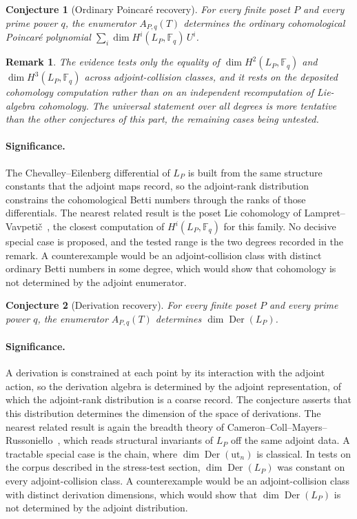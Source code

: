 \documentclass[11pt]{article}
\newtheorem{conjecture}{Conjecture}
\newtheorem{remark}{Remark}
\theoremstyle{definition}
\newcommand{\Fq}{\mathbb F}
\begin{document}
\begin{conjecture}[Ordinary Poincar\'e recovery]\label{v3}
For every finite poset $P$ and every prime power $q$, the enumerator $A_{P,q}(T)$ determines the ordinary cohomological Poincar\'e polynomial $\sum_i\dim H^i(L_P,\Fq_q)\,U^i$.
\end{conjecture}

\begin{remark}
The evidence tests only the equality of $\dim H^2(L_P,\Fq_q)$ and $\dim H^3(L_P,\Fq_q)$ across adjoint-collision classes, and it rests on the deposited cohomology computation rather than on an independent recomputation of Lie-algebra cohomology.  The universal statement over all degrees is more tentative than the other conjectures of this part, the remaining cases being untested.
\end{remark}

\paragraph{Significance.}
The Chevalley--Eilenberg differential of $L_P$ is built from the same structure constants that the adjoint maps record, so the adjoint-rank distribution constrains the cohomological Betti numbers through the ranks of those differentials.  The nearest related result is the poset Lie cohomology of Lampret--Vavpeti\v{c}~\cite{LV}, the closest computation of $H^i(L_P,\Fq_q)$ for this family.  No decisive special case is proposed, and the tested range is the two degrees recorded in the remark.  A counterexample would be an adjoint-collision class with distinct ordinary Betti numbers in some degree, which would show that cohomology is not determined by the adjoint enumerator.

\begin{conjecture}[Derivation recovery]\label{v4}
For every finite poset $P$ and every prime power $q$, the enumerator $A_{P,q}(T)$ determines $\dim\operatorname{Der}(L_P)$.
\end{conjecture}

\paragraph{Significance.}
A derivation is constrained at each point by its interaction with the adjoint action, so the derivation algebra is determined by the adjoint representation, of which the adjoint-rank distribution is a coarse record.  The conjecture asserts that this distribution determines the dimension of the space of derivations.  The nearest related result is again the breadth theory of Cameron--Coll--Mayers--Russoniello~\cite{CCMR}, which reads structural invariants of $L_P$ off the same adjoint data.  A tractable special case is the chain, where $\dim\operatorname{Der}(\mathrm{ut}_n)$ is classical.  In tests on the corpus described in the stress-test section, $\dim\operatorname{Der}(L_P)$ was constant on every adjoint-collision class.  A counterexample would be an adjoint-collision class with distinct derivation dimensions, which would show that $\dim\operatorname{Der}(L_P)$ is not determined by the adjoint distribution.
\end{document}
